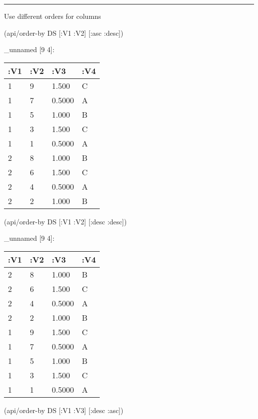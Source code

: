 \documentclass[]{article}
\newenvironment{Shaded}{\begin{snugshade}}{\end{snugshade}}
\newcommand{\AttributeTok}[1]{\textcolor[rgb]{0.77,0.63,0.00}{#1}}
\newcommand{\NormalTok}[1]{#1}
\begin{document}
\begin{center}\rule{0.5\linewidth}{0.5pt}\end{center}

Use different orders for columns

\begin{Shaded}
\begin{Highlighting}[]
\NormalTok{(api/order-by DS [}\AttributeTok{:V1} \AttributeTok{:V2}\NormalTok{] [}\AttributeTok{:asc} \AttributeTok{:desc}\NormalTok{])}
\end{Highlighting}
\end{Shaded}

\_unnamed {[}9 4{]}:

\begin{longtable}[]{@{}llll@{}}
\toprule
:V1 & :V2 & :V3 & :V4\tabularnewline
\midrule
\endhead
1 & 9 & 1.500 & C\tabularnewline
1 & 7 & 0.5000 & A\tabularnewline
1 & 5 & 1.000 & B\tabularnewline
1 & 3 & 1.500 & C\tabularnewline
1 & 1 & 0.5000 & A\tabularnewline
2 & 8 & 1.000 & B\tabularnewline
2 & 6 & 1.500 & C\tabularnewline
2 & 4 & 0.5000 & A\tabularnewline
2 & 2 & 1.000 & B\tabularnewline
\bottomrule
\end{longtable}

\begin{Shaded}
\begin{Highlighting}[]
\NormalTok{(api/order-by DS [}\AttributeTok{:V1} \AttributeTok{:V2}\NormalTok{] [}\AttributeTok{:desc} \AttributeTok{:desc}\NormalTok{])}
\end{Highlighting}
\end{Shaded}

\_unnamed {[}9 4{]}:

\begin{longtable}[]{@{}llll@{}}
\toprule
:V1 & :V2 & :V3 & :V4\tabularnewline
\midrule
\endhead
2 & 8 & 1.000 & B\tabularnewline
2 & 6 & 1.500 & C\tabularnewline
2 & 4 & 0.5000 & A\tabularnewline
2 & 2 & 1.000 & B\tabularnewline
1 & 9 & 1.500 & C\tabularnewline
1 & 7 & 0.5000 & A\tabularnewline
1 & 5 & 1.000 & B\tabularnewline
1 & 3 & 1.500 & C\tabularnewline
1 & 1 & 0.5000 & A\tabularnewline
\bottomrule
\end{longtable}

\begin{Shaded}
\begin{Highlighting}[]
\NormalTok{(api/order-by DS [}\AttributeTok{:V1} \AttributeTok{:V3}\NormalTok{] [}\AttributeTok{:desc} \AttributeTok{:asc}\NormalTok{])}
\end{Highlighting}
\end{Shaded}
\end{document}
